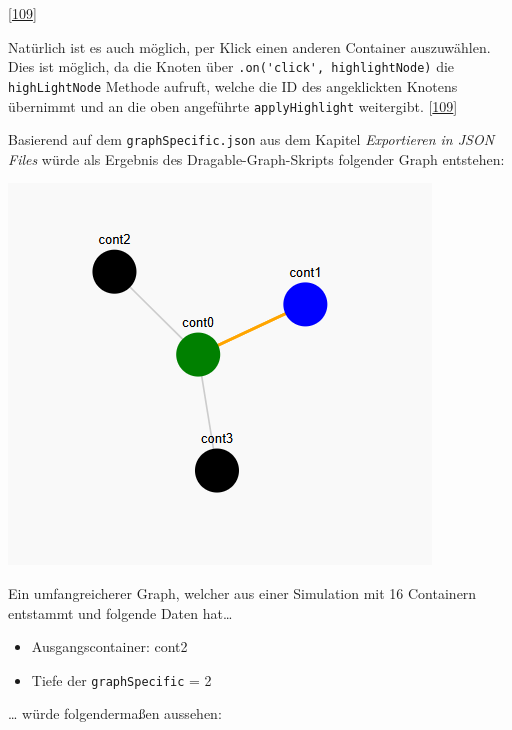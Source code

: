 \documentclass[
    headings=optiontotocandhead,%
    twoside,
    numbers=noenddot,%
    12pt, %
    titlepage, %
    parskip=full, %
    listof=leveldown, 
    numbers=noenddot, %
    a4paper,DIV=14,
    BCOR=15mm,
]{scrbook}
\newcommand{\passthrough}[1]{#1}
\let\origfigure=\figure
\let\endorigfigure=\endfigure
\renewenvironment{figure}[1][]{%
   \origfigure[H]
}{%
   \endorigfigure
}
\providecommand{\tightlist}{%
  \setlength{\itemsep}{0pt}\setlength{\parskip}{0pt}}
\begin{document}
{[}\protect\hyperlink{ref-gpt-D3jsDGScript-Erweiterung}{109}{]}

Natürlich ist es auch möglich, per Klick einen anderen Container
auszuwählen. Dies ist möglich, da die Knoten über
\passthrough{\lstinline!.on('click', highlightNode)!} die
\passthrough{\lstinline!highLightNode!} Methode aufruft, welche die ID
des angeklickten Knotens übernimmt und an die oben angeführte
\passthrough{\lstinline!applyHighlight!} weitergibt.
{[}\protect\hyperlink{ref-gpt-D3jsDGScript-Erweiterung}{109}{]}

Basierend auf dem \passthrough{\lstinline!graphSpecific.json!} aus dem
Kapitel \emph{Exportieren in JSON Files} würde als Ergebnis des
Dragable-Graph-Skripts folgender Graph entstehen:

\begin{figure}
\centering
\includegraphics{img/Gekle/DG-Example.png}
\caption{Dragable Graph basierend auf graphSpecific aus vorhergehendem
Kapitel}
\end{figure}

Ein umfangreicherer Graph, welcher aus einer Simulation mit 16
Containern entstammt und folgende Daten hat\ldots{}

\begin{itemize}
\tightlist
\item
  Ausgangscontainer: cont2
\item
  Tiefe der \passthrough{\lstinline!graphSpecific!} = 2
\end{itemize}

\ldots{} würde folgendermaßen aussehen:
\end{document}
